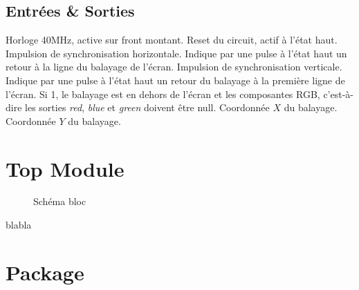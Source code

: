 \documentclass[french]{nakrule}
\begin{document}
\subsection{Entrées \& Sorties}
\label{subsec:Entrées_Sorties_dmc}

\begin{descr}
   Horloge 40MHz, active sur front montant.
   Reset du circuit, actif à l'état haut.
   Impulsion de synchronisation horizontale. Indique par une pulse
  à l'état haut un retour à la ligne du balayage de l'écran.
   Impulsion de synchronisation verticale. Indique par une pulse à
  l'état haut un retour du balayage à la première ligne de l'écran.
   Si 1, le balayage est en dehors de l'écran et les
  composantes RGB, c'est-à-dire les sorties \emph{red}, \emph{blue} et
  \emph{green} doivent être null.
   Coordonnée $X$ du balayage.
   Coordonnée $Y$ du balayage.
\end{descr}
\clearpage

\section{Top Module}
\label{sec:topmodule}

\begin{figure}
\caption{Schéma bloc}
\label{topModuleBloc}
\end{figure}

blabla

\clearpage

\section{Package}
\label{sec:package}
\end{document}
